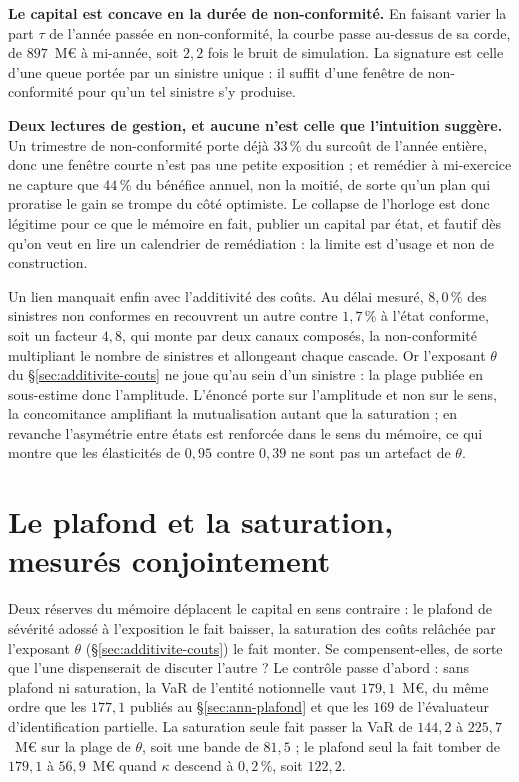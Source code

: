 \textbf{Le capital est concave en la durée de non-conformité.} En faisant varier la part $\tau$ de
l'année passée en non-conformité, la courbe passe au-dessus de sa corde, de $897$~M\euro{} à
mi-année, soit $2{,}2$ fois le bruit de simulation. La signature est celle d'une queue portée par
un sinistre unique : il suffit d'une fenêtre de non-conformité pour qu'un tel sinistre s'y
produise.

\begin{cle}
\textbf{Deux lectures de gestion, et aucune n'est celle que l'intuition suggère.} Un trimestre de
non-conformité porte déjà $33\,\%$ du surcoût de l'année entière, donc une fenêtre courte n'est pas
une petite exposition ; et remédier à mi-exercice ne capture que $44\,\%$ du bénéfice annuel, non
la moitié, de sorte qu'un plan qui proratise le gain se trompe du côté optimiste. Le collapse de
l'horloge est donc légitime pour ce que le mémoire en fait, publier un capital par état, et fautif
dès qu'on veut en lire un calendrier de remédiation : la limite est d'usage et non de construction.
\end{cle}

\noindent Un lien manquait enfin avec l'additivité des coûts. Au délai mesuré, $8{,}0\,\%$ des
sinistres non conformes en recouvrent un autre contre $1{,}7\,\%$ à l'état conforme, soit un
facteur $4{,}8$, qui monte par deux canaux composés, la non-conformité multipliant le nombre de
sinistres et allongeant chaque cascade. Or l'exposant $\theta$ du \S\ref{sec:additivite-couts} ne
joue qu'au sein d'un sinistre : la plage publiée en sous-estime donc l'amplitude. L'énoncé porte
sur l'amplitude et non sur le sens, la concomitance amplifiant la mutualisation autant que la
saturation ; en revanche l'asymétrie entre états est renforcée dans le sens du mémoire, ce qui
montre que les élasticités de $0{,}95$ contre $0{,}39$ ne sont pas un artefact de $\theta$.

\section{Le plafond et la saturation, mesurés conjointement}
\label{sec:ann-plafond-saturation}

Deux réserves du mémoire déplacent le capital en sens contraire : le plafond de sévérité adossé à
l'exposition le fait baisser, la saturation des coûts relâchée par l'exposant $\theta$
(\S\ref{sec:additivite-couts}) le fait monter. Se compensent-elles, de sorte que l'une
dispenserait de discuter l'autre ? Le contrôle passe d'abord : sans plafond ni saturation, la VaR
de l'entité notionnelle vaut $179{,}1$~M\euro, du même ordre que les $177{,}1$ publiés au
\S\ref{sec:ann-plafond} et que les $169$ de l'évaluateur d'identification partielle. La saturation
seule fait passer la VaR de $144{,}2$ à $225{,}7$~M\euro{} sur la plage de $\theta$, soit une bande
de $81{,}5$ ; le plafond seul la fait tomber de $179{,}1$ à $56{,}9$~M\euro{} quand $\kappa$
descend à $0{,}2\,\%$, soit $122{,}2$.

